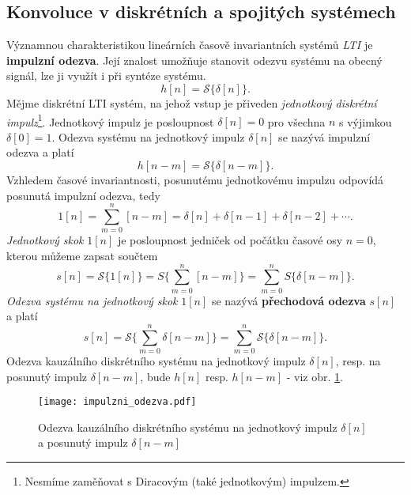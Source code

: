     \subsection{Konvoluce v diskrétních a spojitých systémech}
      \cite{Bicak} Významnou charakteristikou lineárních časově invariantních systémů \emph{LTI} je
      \textbf{impulzní odezva}. Její znalost umožňuje stanovit odezvu systému na obecný signál, lze ji využít 
      i při syntéze systému.
      \begin{equation}\label{sas:eq_odezva3}
        h[n]= \mathcal{S}\{\delta[n]\}.
      \end{equation}
      Mějme diskrétní LTI systém, na jehož vstup je přiveden \emph{jednotkový diskrétní      
      impulz}\footnote{Nesmíme zaměňovat s Diracovým (také jednotkovým) impulzem.}. Jednotkový impulz je 
      posloupnost $\delta[n]=0$ pro všechna $n$ s výjimkou $\delta[0]=1$. Odezva systému na jednotkový impulz 
      $\delta[n]$ se nazývá impulzní odezva a platí
      \begin{equation}\label{sas:eq_odezva_posun}
        h[n-m]= \mathcal{S}\{\delta[n-m]\}.
      \end{equation}
      Vzhledem časové invariantnosti, posunutému jednotkovému impulzu odpovídá posunutá impulzní
      odezva, tedy
      \begin{equation}\label{sas:eq_jednotkovy_skok}
        1[n]= \sum_{m=0}^n[n-m] =\delta[n]+\delta[n-1]+\delta[n-2]+\cdots.
      \end{equation}
      \emph{Jednotkový skok} $\mathrm{1}[n]$ je posloupnost jedniček od počátku časové osy $n=0$,
      kterou můžeme zapsat součtem
      \begin{equation}\label{sas:eq_odezva_skok}
        s[n]= \mathcal{S}\{\mathrm{1}[n]\}=S\{\sum_{m=0}^n[n-m]\}=\sum_{m=0}^nS\{\delta[n-m]\}.
      \end{equation}
      \emph{Odezva systému na jednotkový skok} $\mathrm{1}[n]$ se nazývá \textbf{přechodová odezva}
      $s[n]$ a platí
      \begin{equation}\label{SAS:eq_odezva_skok2}
        s[n]=\mathcal{S}\{\sum_{m=0}^n\delta[n-m]\}=\sum_{m=0}^n\mathcal{S}\{\delta[n-m]\}.
      \end{equation}
      Odezva kauzálního diskrétního systému na jednotkový impulz $\delta[n]$, resp. na posunutý
      impulz $\delta[n-m]$, bude  $h[n]$  resp.  $h[n-m]$ - viz obr. \ref{SAS:fig_odezva3}.
      \begin{figure}[ht!]
        \centering
        \texttt{[image: impulzni\_odezva.pdf]}
         \caption[Impulzní odezva]{Odezva kauzálního diskrétního systému na jednotkový impulz
                  $\delta[n]$ a posunutý impulz $\delta[n-m]$}
        \label{SAS:fig_odezva3}
      \end{figure}
  
